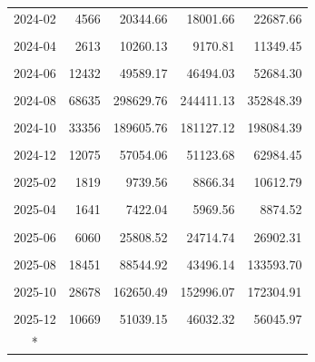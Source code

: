 \begin{longtable}[t]{crrrr}
2024-02 & 4566 & 20344.66 & 18001.66 & 22687.66\\
\cellcolor{gray!10}{2024-03} & \cellcolor{gray!10}{5448} & \cellcolor{gray!10}{20350.22} & \cellcolor{gray!10}{17625.53} & \cellcolor{gray!10}{23074.92}\\
2024-04 & 2613 & 10260.13 & 9170.81 & 11349.45\\
\cellcolor{gray!10}{2024-05} & \cellcolor{gray!10}{6324} & \cellcolor{gray!10}{24015.00} & \cellcolor{gray!10}{21954.81} & \cellcolor{gray!10}{26075.20}\\
2024-06 & 12432 & 49589.17 & 46494.03 & 52684.30\\
\cellcolor{gray!10}{2024-07} & \cellcolor{gray!10}{22478} & \cellcolor{gray!10}{71959.65} & \cellcolor{gray!10}{50966.62} & \cellcolor{gray!10}{92952.68}\\
2024-08 & 68635 & 298629.76 & 244411.13 & 352848.39\\
\cellcolor{gray!10}{2024-09} & \cellcolor{gray!10}{83154} & \cellcolor{gray!10}{400042.14} & \cellcolor{gray!10}{371083.20} & \cellcolor{gray!10}{429001.08}\\
2024-10 & 33356 & 189605.76 & 181127.12 & 198084.39\\
\cellcolor{gray!10}{2024-11} & \cellcolor{gray!10}{22663} & \cellcolor{gray!10}{107425.06} & \cellcolor{gray!10}{94720.69} & \cellcolor{gray!10}{120129.43}\\
2024-12 & 12075 & 57054.06 & 51123.68 & 62984.45\\
\cellcolor{gray!10}{2025-01} & \cellcolor{gray!10}{3137} & \cellcolor{gray!10}{16757.64} & \cellcolor{gray!10}{14466.00} & \cellcolor{gray!10}{19049.27}\\
2025-02 & 1819 & 9739.56 & 8866.34 & 10612.79\\
\cellcolor{gray!10}{2025-03} & \cellcolor{gray!10}{2357} & \cellcolor{gray!10}{9985.32} & \cellcolor{gray!10}{8763.15} & \cellcolor{gray!10}{11207.48}\\
2025-04 & 1641 & 7422.04 & 5969.56 & 8874.52\\
\cellcolor{gray!10}{2025-05} & \cellcolor{gray!10}{4263} & \cellcolor{gray!10}{17061.21} & \cellcolor{gray!10}{16001.28} & \cellcolor{gray!10}{18121.13}\\
2025-06 & 6060 & 25808.52 & 24714.74 & 26902.31\\
\cellcolor{gray!10}{2025-07} & \cellcolor{gray!10}{9803} & \cellcolor{gray!10}{48976.88} & \cellcolor{gray!10}{35734.14} & \cellcolor{gray!10}{62219.62}\\
2025-08 & 18451 & 88544.92 & 43496.14 & 133593.70\\
\cellcolor{gray!10}{2025-09} & \cellcolor{gray!10}{28214} & \cellcolor{gray!10}{159794.45} & \cellcolor{gray!10}{133963.29} & \cellcolor{gray!10}{185625.62}\\
2025-10 & 28678 & 162650.49 & 152996.07 & 172304.91\\
\cellcolor{gray!10}{2025-11} & \cellcolor{gray!10}{21301} & \cellcolor{gray!10}{101274.53} & \cellcolor{gray!10}{90195.63} & \cellcolor{gray!10}{112353.43}\\
2025-12 & 10669 & 51039.15 & 46032.32 & 56045.97\\*
\end{longtable}

